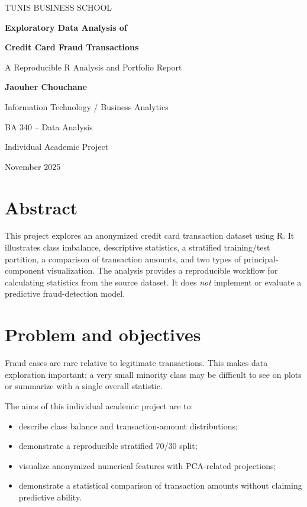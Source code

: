\documentclass[11pt,a4paper]{article}
\begin{document}
\begin{titlepage}
  \centering
  \vspace*{34mm}
  {\Large\color{navy} TUNIS BUSINESS SCHOOL \par}
  \vspace{14mm}
  {\huge\bfseries Exploratory Data Analysis of\par}
  \vspace{2mm}
  {\huge\bfseries Credit Card Fraud Transactions\par}
  \vspace{10mm}
  {\large A Reproducible R Analysis and Portfolio Report\par}
  \vspace{24mm}
  {\Large\bfseries Jaouher Chouchane\par}
  \vspace{4mm}
  {\large Information Technology / Business Analytics\par}
  \vspace{4mm}
  BA 340 -- Data Analysis\par
  \vfill
  Individual Academic Project\par
  November 2025\par
\end{titlepage}

\section*{Abstract}

This project explores an anonymized credit card transaction dataset using R. It illustrates class imbalance, descriptive statistics, a stratified training/test partition, a comparison of transaction amounts, and two types of principal-component visualization. The analysis provides a reproducible workflow for calculating statistics from the source dataset. It does \emph{not} implement or evaluate a predictive fraud-detection model.

\section{Problem and objectives}

Fraud cases are rare relative to legitimate transactions. This makes data exploration important: a very small minority class may be difficult to see on plots or summarize with a single overall statistic.

The aims of this individual academic project are to:
\begin{itemize}
  \item describe class balance and transaction-amount distributions;
  \item demonstrate a reproducible stratified 70/30 split;
  \item visualize anonymized numerical features with PCA-related projections;
  \item demonstrate a statistical comparison of transaction amounts without claiming predictive ability.
\end{itemize}
\end{document}
